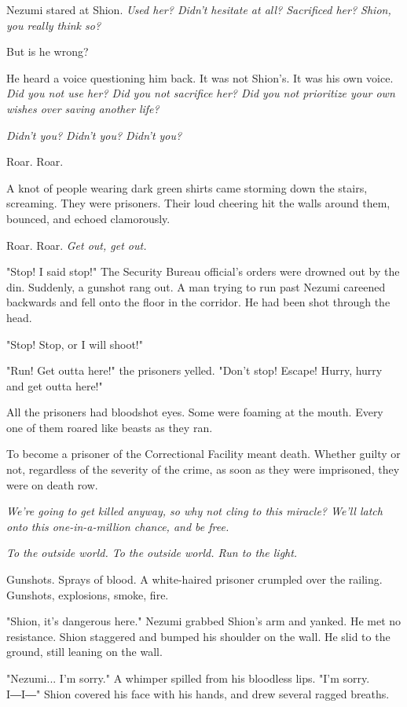 Nezumi stared at Shion. \emph{Used her? Didn't hesitate at all? Sacrificed
her? Shion, you really think so?}

But is he wrong?

He heard a voice questioning him back. It was not Shion's. It was his
own voice. \emph{Did you not use her? Did you not sacrifice her? Did you not
prioritize your own wishes over saving another life?}

\emph{Didn't you? Didn't you? Didn't you?}

Roar. Roar.

A knot of people wearing dark green shirts came storming down the
stairs, screaming. They were prisoners. Their loud cheering hit the
walls around them, bounced, and echoed clamorously.

Roar. Roar. \emph{Get out, get out.}

"Stop! I said stop!" The Security Bureau official's orders were drowned
out by the din. Suddenly, a gunshot rang out. A man trying to run past
Nezumi careened backwards and fell onto the floor in the corridor. He
had been shot through the head.

"Stop! Stop, or I will shoot!"

"Run! Get outta here!" the prisoners yelled. "Don't stop! Escape! Hurry,
hurry and get outta here!"

All the prisoners had bloodshot eyes. Some were foaming at the mouth.
Every one of them roared like beasts as they ran.

To become a prisoner of the Correctional Facility meant death. Whether
guilty or not, regardless of the severity of the crime, as soon as they
were imprisoned, they were on death row.

\emph{We're going to get killed anyway, so why not cling to this miracle?
We'll latch onto this one-in-a-million chance, and be free.}

\emph{To the outside world. To the outside world. Run to the light.}

Gunshots. Sprays of blood. A white-haired prisoner crumpled over the
railing. Gunshots, explosions, smoke, fire.

"Shion, it's dangerous here." Nezumi grabbed Shion's arm and yanked. He
met no resistance. Shion staggered and bumped his shoulder on the wall.
He slid to the ground, still leaning on the wall.

"Nezumi... I'm sorry." A whimper spilled from his bloodless lips. "I'm
sorry. I―I―" Shion covered his face with his hands, and drew several
ragged breaths.

